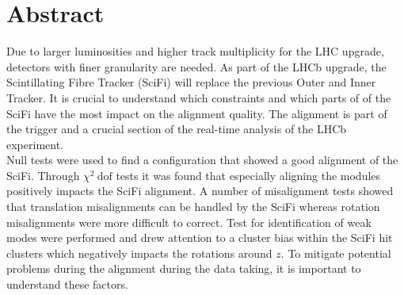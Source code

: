 \chapter*{Abstract}
\label{sec:abstract}

Due to larger luminosities and higher track multiplicity for the LHC upgrade, detectors with finer granularity are needed.
As part of the LHCb upgrade, the Scintillating Fibre Tracker (SciFi) will replace the previous Outer and Inner Tracker. It is crucial to understand which constraints and which parts of of the SciFi have the most impact on the alignment quality.
The alignment is part of the trigger and a crucial section of the real-time analysis of the LHCb experiment.
\\
Null tests were used to find a configuration that showed a good alignment of the SciFi.
Through $\chi^2 \ \text{dof}$ tests it was found that especially aligning the modules positively impacts the SciFi alignment.
A number of misalignment tests showed that translation misalignments can be handled by the SciFi whereas rotation misalignments were more difficult to correct.
Test for identification of weak modes were performed and drew attention to a cluster bias within the SciFi hit clusters which negatively impacts the rotations around $z$.
To mitigate potential problems during the alignment during the data taking, it is important to understand these factors.

